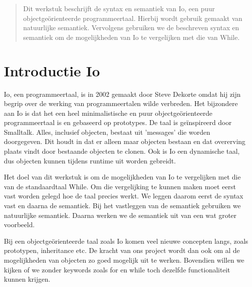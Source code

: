 \documentclass[12pt]{article}
\begin{document}
\maketitle

\begin{abstract}
Dit werkstuk beschrijft de syntax en semantiek van Io, een puur objectge\"orienteerde programmeertaal.
Hierbij wordt gebruik gemaakt van natuurlijke semantiek. Vervolgens gebruiken we de beschreven syntax en semantiek om
de mogelijkheden van Io te vergelijken met die van While.
\end{abstract}

\section{Introductie Io}
Io, een programmeertaal, is in 2002 gemaakt door Steve Dekorte omdat hij zijn begrip over de werking van programmeertalen wilde verbreden.
Het bijzondere aan Io is dat het een heel minimalistische en puur objectge\"orienteerde programmeertaal is en gebaseerd op prototypes. De taal is ge\"inspireerd door Smalltalk. Alles, inclusief objecten, bestaat uit 'messages' die worden doorgegeven.
Dit houdt in dat er alleen maar objecten bestaan en dat overerving plaats vindt door bestaande objecten te clonen.
Ook is Io een dynamische taal, dus objecten kunnen tijdens runtime uit worden gebreidt.

Het doel van dit werkstuk is om de mogelijkheden van Io te vergelijken met die van de standaardtaal While.
Om die vergelijking te kunnen maken moet eerst vast worden gelegd hoe de taal precies werkt.
We leggen daarom eerst de syntax vast en daarna de semantiek. Bij het vastleggen van de semantiek gebruiken we natuurlijke semantiek.
Daarna werken we de semantiek uit van een wat groter voorbeeld.

Bij een objectge\"orienteerde taal zoals Io komen veel nieuwe concepten langs, zoals prototypen, inheritance etc. De kracht van ons project wordt dan ook om al de mogelijkheden van objecten 
zo goed mogelijk uit te werken.  Bovendien willen we kijken of we zonder keywords zoals for en while toch dezelfde functionaliteit kunnen krijgen.
\end{document}
